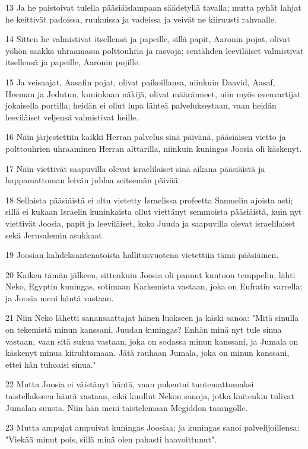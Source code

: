 \par 13 Ja he paistoivat tulella pääsiäislampaan säädetyllä tavalla; mutta pyhät lahjat he keittivät padoissa, ruukuissa ja vadeissa ja veivät ne kiiruusti rahvaalle.
\par 14 Sitten he valmistivat itsellensä ja papeille, sillä papit, Aaronin pojat, olivat yöhön saakka uhraamassa polttouhria ja rasvoja; sentähden leeviläiset valmistivat itsellensä ja papeille, Aaronin pojille.
\par 15 Ja veisaajat, Aasafin pojat, olivat paikoillansa, niinkuin Daavid, Aasaf, Heeman ja Jedutun, kuninkaan näkijä, olivat määränneet, niin myös ovenvartijat jokaisella portilla; heidän ei ollut lupa lähteä palveluksestaan, vaan heidän leeviläiset veljensä valmistivat heille.
\par 16 Näin järjestettiin kaikki Herran palvelus sinä päivänä, pääsiäisen vietto ja polttouhrien uhraaminen Herran alttarilla, niinkuin kuningas Joosia oli käskenyt.
\par 17 Näin viettivät saapuvilla olevat israelilaiset sinä aikana pääsiäistä ja happamattoman leivän juhlaa seitsemän päivää.
\par 18 Sellaista pääsiäistä ei oltu vietetty Israelissa profeetta Samuelin ajoista asti; sillä ei kukaan Israelin kuninkaista ollut viettänyt semmoista pääsiäistä, kuin nyt viettivät Joosia, papit ja leeviläiset, koko Juuda ja saapuvilla olevat israelilaiset sekä Jerusalemin asukkaat.
\par 19 Joosian kahdeksantenatoista hallitusvuotena vietettiin tämä pääsiäinen.
\par 20 Kaiken tämän jälkeen, sittenkuin Joosia oli pannut kuntoon temppelin, lähti Neko, Egyptin kuningas, sotimaan Karkemista vastaan, joka on Eufratin varrella; ja Joosia meni häntä vastaan.
\par 21 Niin Neko lähetti sanansaattajat hänen luokseen ja käski sanoa: "Mitä sinulla on tekemistä minun kanssani, Juudan kuningas? Enhän minä nyt tule sinua vastaan, vaan sitä sukua vastaan, joka on sodassa minun kanssani, ja Jumala on käskenyt minua kiiruhtamaan. Jätä rauhaan Jumala, joka on minun kanssani, ettei hän tuhoaisi sinua."
\par 22 Mutta Joosia ei väistänyt häntä, vaan pukeutui tuntemattomaksi taistellakseen häntä vastaan, eikä kuullut Nekon sanoja, jotka kuitenkin tulivat Jumalan suusta. Niin hän meni taistelemaan Megiddon tasangolle.
\par 23 Mutta ampujat ampuivat kuningas Joosiaa; ja kuningas sanoi palvelijoillensa: "Viekää minut pois, sillä minä olen pahasti haavoittunut".
